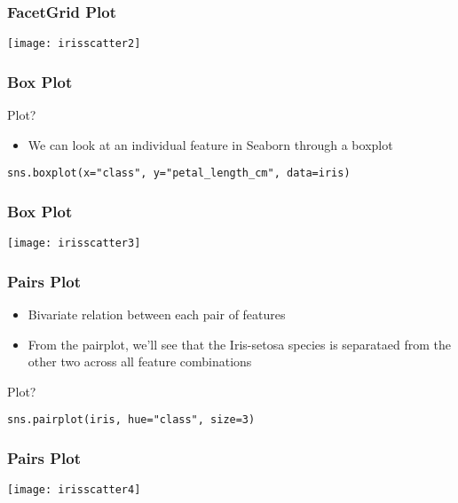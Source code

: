 \begin{frame}[fragile]\frametitle{FacetGrid Plot}
\begin{center}
\texttt{[image: irisscatter2]}
\end{center}
\end{frame}

\begin{frame}[fragile]\frametitle{Box Plot}
Plot?

\begin{itemize}
\item We can look at an individual feature in Seaborn through a boxplot
\end{itemize}
\begin{lstlisting}
sns.boxplot(x="class", y="petal_length_cm", data=iris)
\end{lstlisting}

\end{frame}


\begin{frame}[fragile]\frametitle{Box Plot}
\begin{center}
\texttt{[image: irisscatter3]}
\end{center}
\end{frame}

\begin{frame}[fragile]\frametitle{Pairs Plot}
\begin{itemize}
\item Bivariate relation between each pair of features
\item From the pairplot, we'll see that the Iris-setosa species is separataed from the other two across all feature combinations
\end{itemize}

Plot?

\begin{lstlisting}
sns.pairplot(iris, hue="class", size=3)
\end{lstlisting}

\end{frame}

\begin{frame}[fragile]\frametitle{Pairs Plot}
\begin{center}
\texttt{[image: irisscatter4]}
\end{center}
\end{frame}


